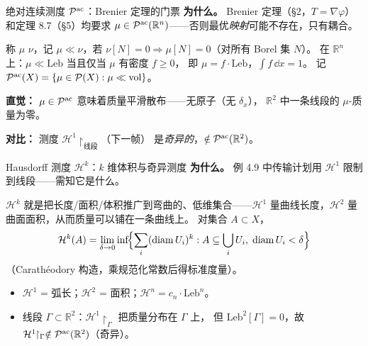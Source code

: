 \begin{frame}{绝对连续测度 $\mathcal{P}^{\mathrm{ac}}$：Brenier 定理的门票}
  \textbf{为什么。} Brenier 定理（§2，$T=\nabla\varphi$）和定理 8.7（§5）均要求
  $\mu\in\mathcal{P}^{\mathrm{ac}}(\mathbb{R}^n)$——否则最优\emph{映射}可能不存在，只有耦合。

   称 $\mu$
   $\nu$，记 $\mu\ll\nu$，若
  $\nu[N]=0 \Rightarrow \mu[N]=0$（对所有 Borel 集 $N$）。
  在 $\mathbb{R}^n$ 上：$\mu\ll\mathrm{Leb}$ 当且仅当 $\mu$ 有密度 $f\ge0$，
  即 $\mu=f\cdot\mathrm{Leb}$，$\int f\,\dd x=1$。
  记 $\mathcal{P}^{\mathrm{ac}}(X)=\{\mu\in\mathcal{P}(X):\mu\ll\mathrm{vol}\}$。

  \medskip
  \textbf{直觉：} $\mu\in\mathcal{P}^{\mathrm{ac}}$ 意味着质量平滑散布——无原子（无 $\delta_x$），
  $\mathbb{R}^2$ 中一条线段的 $\mu$-质量为零。

  \textbf{对比：} 测度 $\mathcal{H}^{1}\!\!\restriction_{\text{线段}}$（下一帧）
  是\emph{奇异的}，$\notin\mathcal{P}^{\mathrm{ac}}(\mathbb{R}^2)$。

\end{frame}

\begin{frame}{Hausdorff 测度 $\mathcal{H}^{k}$：$k$ 维体积与奇异测度}
  \textbf{为什么。} 例 4.9 中传输计划用 $\mathcal{H}^{1}$ 限制到线段——需知它是什么。

   $\mathcal{H}^{k}$ 就是把长度/面积/体积推广到弯曲的、低维集合——$\mathcal{H}^{1}$ 量曲线长度，$\mathcal{H}^{2}$ 量曲面面积，从而质量可以铺在一条曲线上。
   对集合 $A\subset X$，
  \[
    \mathcal{H}^{k}(A) = \lim_{\delta\to0}\inf\!\Bigl\{
      \sum_{i}(\mathrm{diam}\,U_i)^{k} :
      A\subseteq\bigcup_{i}U_i,\;\mathrm{diam}\,U_i<\delta
    \Bigr\}
  \]
  （Carathéodory 构造，乘规范化常数后得标准度量）。

  \begin{itemize}\small
    \item $\mathcal{H}^{1}$ = 弧长；$\mathcal{H}^{2}$ = 面积；$\mathcal{H}^{n}=c_n\cdot\mathrm{Leb}^n$。
    \item 线段 $\Gamma\subset\mathbb{R}^2$：$\mathcal{H}^{1}\!\!\restriction_{\Gamma}$ 把质量分布在 $\Gamma$ 上，
      但 $\mathrm{Leb}^2[\Gamma]=0$，故 $\mathcal{H}^{1}\!\!\restriction_{\Gamma}\notin\mathcal{P}^{\mathrm{ac}}(\mathbb{R}^2)$（奇异）。
  \end{itemize}

\end{frame}

